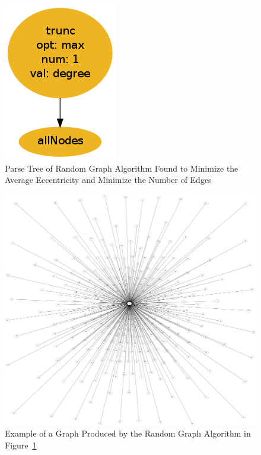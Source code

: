 \documentclass{article}
\begin{document}
\begin{figure}
\begin{centering}
  \includegraphics[scale=0.45]{minE.png}
  \caption{Parse Tree of Random Graph Algorithm Found to Minimize the Average Eccentricity and Minimize the Number of Edges}
  \label{fig:minE}
\end{centering}
\end{figure}

\begin{figure}
\begin{centering}
  \includegraphics[scale=0.1]{minEGraph.png}
  \caption{Example of a Graph Produced by the Random Graph Algorithm in Figure~\ref{fig:minE}}
  \label{fig:minEGraph}
\end{centering}
\end{figure}
\end{document}
